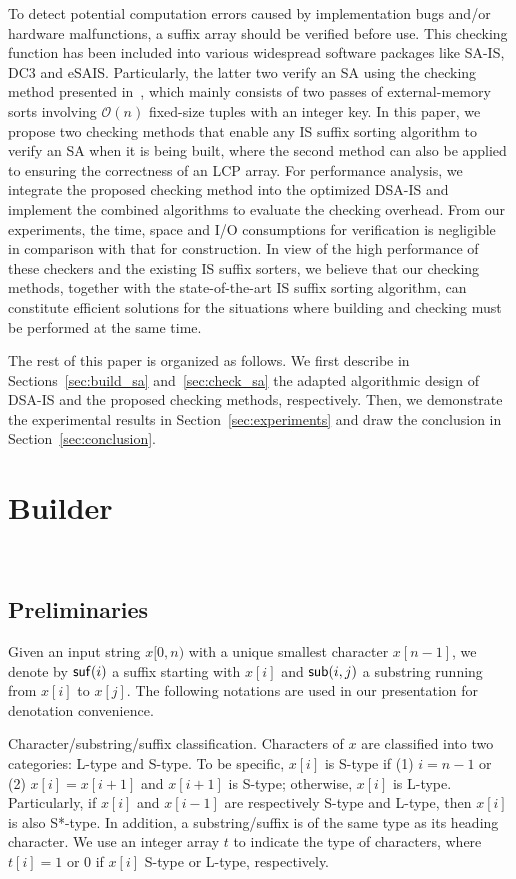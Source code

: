\documentclass[10pt,journal,compsoc]{IEEEtran}
\begin{document}
To detect potential computation errors caused by implementation bugs and/or hardware malfunctions, a suffix array should be verified before use. This checking function has been included into various widespread software packages like SA-IS, DC3 and eSAIS. Particularly, the latter two verify an SA using the checking method presented in~\cite{Dementiev2008a}, which mainly consists of two passes of external-memory sorts involving $\mathcal{O}(n)$ fixed-size tuples with an integer key. In this paper, we propose two checking methods that enable any IS suffix sorting algorithm to verify an SA when it is being built, where the second method can also be applied to ensuring the correctness of an LCP array. For performance analysis, we integrate the proposed checking method into the optimized DSA-IS and implement the combined algorithms to evaluate the checking overhead. From our experiments, the time, space and I/O consumptions for verification is negligible in comparison with that for construction. In view of the high performance of these checkers and the existing IS suffix sorters, we believe that our checking methods, together with the state-of-the-art IS suffix sorting algorithm, can constitute efficient solutions for the situations where building and checking must be performed at the same time.

The rest of this paper is organized as follows. We first describe in Sections~\ref{sec:build_sa} and~\ref{sec:check_sa} the adapted algorithmic design of DSA-IS and the proposed checking methods, respectively. Then, we demonstrate the experimental results in Section~\ref{sec:experiments} and draw the conclusion in Section~\ref{sec:conclusion}.


\section{Builder}~\label{sec:build_sa}

\subsection{Preliminaries}

Given an input string $x[0, n)$ with a unique smallest character $x[n - 1]$, we denote by ${\sf suf}(i)$ a suffix starting with $x[i]$ and ${\sf sub}(i,j)$ a substring running from $x[i]$ to $x[j]$. The following notations are used in our presentation for denotation convenience.

Character/substring/suffix classification. Characters of $x$ are classified into two categories: L-type and S-type. To be specific, $x[i]$ is S-type if (1) $i = n - 1$ or (2) $x[i] = x[i + 1]$ and $x[i + 1]$ is S-type; otherwise, $x[i]$ is L-type. Particularly, if $x[i]$ and $x[i - 1]$ are respectively S-type and L-type, then $x[i]$ is also S*-type. In addition, a substring/suffix is of the same type as its heading character. We use an integer array $t$ to indicate the type of characters, where $t[i] = 1$ or $0$ if $x[i] $ S-type or L-type, respectively.
\end{document}
